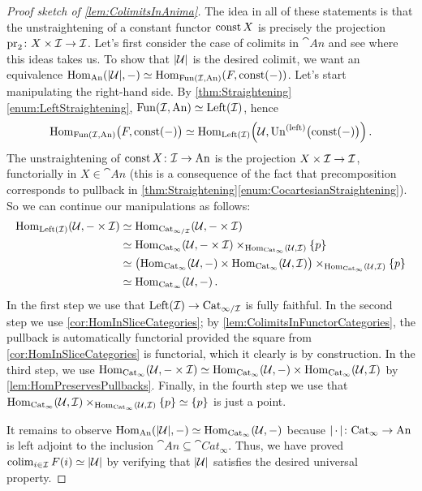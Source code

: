 \begin{proof}[Proof sketch of \cref{lem:ColimitsInAnima}]
	The idea in all of these statements is that the unstraightening of a constant functor $\operatorname{const} X$ is precisely the projection $\operatorname{pr}_2\colon X\times \mathcal{I}\rightarrow \mathcal{I}$. Let's first consider the case of colimits in $\cat{An}$ and see where this ideas takes us. To show that $\abs*{\Uu}$ is the desired colimit, we want an equivalence $\Hom_{\cat{An}}(\abs{\Uu},-)\simeq \Hom_{\Fun(\Ii,\cat{An})}(F,\const(-))$. Let's start manipulating the right-hand side. By \cref{thm:Straightening}\cref{enum:LeftStraightening}, $\operatorname{Fun}(\mathcal{I},\mathrm{An})\simeq\mathrm{Left}(\mathcal{I})$, hence
	\begin{equation*}
		\Hom_{\Fun(\Ii,\cat{An})}\bigl(F,\const(-)\bigr)\simeq \Hom_{\cat{Left}(\Ii)}\left(\Uu,\operatorname{Un}^{(\mathrm{left})}\bigl(\const(-)\bigr)\right)\,.
	\end{equation*}
	The unstraightening of $\operatorname{const} X\colon \mathcal{I}\rightarrow\mathrm{An}$ is the projection $X\times \mathcal{I}\rightarrow\mathcal{I}$, functorially in $X\in\cat{An}$ (this is a consequence of the fact that precomposition corresponds to pullback in \cref{thm:Straightening}\cref{enum:CocartesianStraightening}). So we can continue our manipulations as follows:
	\begin{align*}
		\operatorname{Hom}_{\mathrm{Left}(\mathcal{I})}(\mathcal{U},-\times\mathcal{I})&\simeq \operatorname{Hom}_{\mathrm{Cat}_{\infty/\mathcal{I}}}(\mathcal{U},-\times\mathcal{I})\\
		&\simeq \operatorname{Hom}_{\mathrm{Cat}_\infty}(\mathcal{U},-\times\mathcal{I})\times_{\operatorname{Hom}_{\mathrm{Cat}_\infty}(\mathcal{U},\mathcal{I})}\{p\}\\
		&\simeq \bigl(\operatorname{Hom}_{\mathrm{Cat}_\infty}(\mathcal{U},-)\times\operatorname{Hom}_{\mathrm{Cat}_\infty}(\mathcal{U},\mathcal{I})\bigr)\times_{\operatorname{Hom}_{\mathrm{Cat}_\infty}(\mathcal{U},\mathcal{I})}\{p\}\\
		&\simeq \operatorname{Hom}_{\mathrm{Cat}_\infty}(\mathcal{U},-)\,.
	\end{align*}
	In the first step we use that $\mathrm{Left}(\mathcal{I})\rightarrow \mathrm{Cat}_{\infty/\mathcal{I}}$ is fully faithful. In the second step we use \cref{cor:HomInSliceCategories}; by \cref{lem:ColimitsInFunctorCategories}, the pullback is automatically functorial  provided the square from \cref{cor:HomInSliceCategories} is functorial, which it clearly is by construction. In the third step, we use $\operatorname{Hom}_{\mathrm{Cat}_\infty}(\mathcal{U},-\times\mathcal{I})\simeq \operatorname{Hom}_{\mathrm{Cat}_\infty}(\mathcal{U},-)\times\operatorname{Hom}_{\mathrm{Cat}_\infty}(\mathcal{U},\mathcal{I})$ by \cref{lem:HomPreservesPullbacks}. Finally, in the fourth step we use that $\operatorname{Hom}_{\mathrm{Cat}_\infty}(\mathcal{U},\mathcal{I})\times_{\operatorname{Hom}_{\mathrm{Cat}_\infty}(\mathcal{U},\mathcal{I})}\{p\}\simeq \{p\}$ is just a point.
	
	It remains to observe $\Hom_{\cat{An}}(\abs{\Uu},-)\simeq \Hom_{\cat{Cat}_\infty}(\Uu,-)$ because $\abs{\,\cdot\,}\colon \cat{Cat}_\infty\rightarrow\cat{An}$ is left adjoint to the inclusion $\cat{An}\subseteq\cat{Cat}_\infty$. Thus, we have proved $\colimit_{i\in\Ii}F(i)\simeq \abs{\Uu}$ by verifying that $\abs*{\Uu}$ satisfies the desired universal property.
	

\end{proof}
